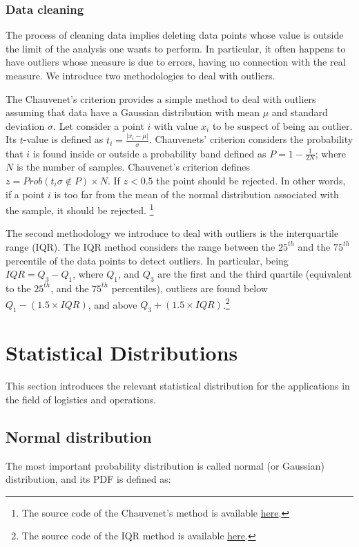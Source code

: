 \subsubsection{Data cleaning}
The process of cleaning data implies deleting data points whose value is outside the limit of the analysis one wants to perform. In particular, it often happens to have outliers whose measure is due to errors, having no connection with the real measure. We introduce two methodologies to deal with outliers.\par

The Chauvenet’s criterion provides a simple method to deal with outliers assuming that data have a Gaussian distribution with mean $\mu$ and standard deviation $\sigma$. Let consider a point $i$ with value $x_i$ to be suspect of being an outlier. Its $t$-value is defined as $t_i=\frac{|x_i-\mu|}{\sigma}$. Chauvenets’ criterion considers the probability that $i$ is found inside or outside a probability band defined as $P=1-\frac{1}{2N}$; where $N$ is the number of samples. Chauvenet’s criterion defines $z=Prob\left(t_i\sigma\notin P\right)\times N$. If $z<0.5$ the point should be rejected. In other words, if a point $i$ is too far from the mean of the normal distribution associated with the sample, it should be rejected. \footnote{The source code of the Chauvenet's method is available \href{https://github.com/aletuf93/logproj/blob/master/logproj/ml_dataCleaning.py}{here}.
} \par
The second methodology we introduce to deal with outliers is the interquartile range (IQR). The IQR method considers the range between the $25^{th}$ and the $75^{th}$ percentile of the data points to detect outliers. In particular, being $IQR = Q_3 - Q_1$, where $Q_1$, and $Q_3$ are the first and the third quartile (equivalent to the $25^{th}$, and the $75^{th}$ percentiles), outliers are found below $Q_1 - (1.5\times IQR)$, and above $Q_3 + (1.5\times IQR)$.\footnote{The source code of the IQR method is available \href{https://github.com/aletuf93/logproj/blob/master/logproj/ml_dataCleaning.py}{here}.
}


\section{Statistical Distributions}
This section introduces the relevant statistical distribution for the applications in the field of logistics and operations.

\subsection{Normal distribution}
The most important probability distribution is called normal (or Gaussian) distribution, and its PDF is defined as:

